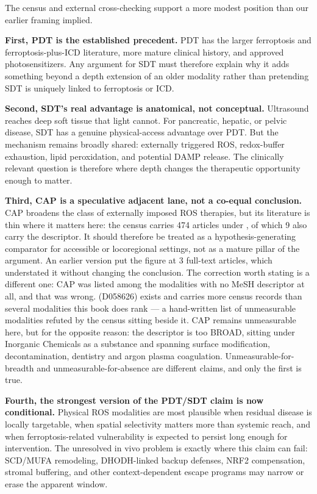 \documentclass[11pt,twoside,openright]{report}
\begin{document}
The census and external cross-checking support a more modest position than our earlier framing implied.

\textbf{First, PDT is the established precedent.} PDT has the larger ferroptosis and ferroptosis-plus-ICD literature, more mature clinical history, and approved photosensitizers. Any argument for SDT must therefore explain why it adds something beyond a depth extension of an older modality rather than pretending SDT is uniquely linked to ferroptosis or ICD.

\textbf{Second, SDT's real advantage is anatomical, not conceptual.} Ultrasound reaches deep soft tissue that light cannot. For pancreatic, hepatic, or pelvic disease, SDT has a genuine physical-access advantage over PDT. But the mechanism remains broadly shared: externally triggered ROS, redox-buffer exhaustion, lipid peroxidation, and potential DAMP release. The clinically relevant question is therefore where depth changes the therapeutic opportunity enough to matter.

\textbf{Third, CAP is a speculative adjacent lane, not a co-equal conclusion.} CAP broadens the class of externally imposed ROS therapies, but its literature is thin where it matters here: the census carries 474 articles under , of which 9 also carry the  descriptor. It should therefore be treated as a hypothesis-generating comparator for accessible or locoregional settings, not as a mature pillar of the argument. An earlier version put the figure at 3 full-text articles, which understated it without changing the conclusion. The correction worth stating is a different one: CAP was listed among the modalities with no MeSH descriptor at all, and that was wrong.  (D058626) exists and carries more census records than several modalities this book does rank --- a hand-written list of unmeasurable modalities refuted by the census sitting beside it. CAP remains unmeasurable here, but for the opposite reason: the descriptor is too BROAD, sitting under Inorganic Chemicals as a substance and spanning surface modification, decontamination, dentistry and argon plasma coagulation. Unmeasurable-for-breadth and unmeasurable-for-absence are different claims, and only the first is true.

\textbf{Fourth, the strongest version of the PDT/SDT claim is now conditional.} Physical ROS modalities are most plausible when residual disease is locally targetable, when spatial selectivity matters more than systemic reach, and when ferroptosis-related vulnerability is expected to persist long enough for intervention. The unresolved in vivo problem is exactly where this claim can fail: SCD/MUFA remodeling, DHODH-linked backup defenses, NRF2 compensation, stromal buffering, and other context-dependent escape programs may narrow or erase the apparent window.
\end{document}
